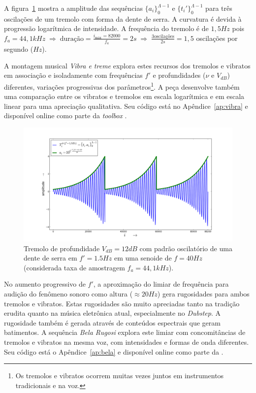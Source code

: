 A figura~\ref{fig:tremolo} mostra a amplitude das sequências $\{a_i\}_0^{\Lambda-1}$ e $\{t_i'\}_0^{\Lambda-1}$
para três oscilações de um tremolo com forma da dente de serra. A curvatura é devida à progressão logarítmica de
intensidade. A frequência do tremolo é de $1,5Hz$ pois $f_a=44,1kHz \; \Rightarrow \; \text{duração} = \frac{i_{\text{máx}}=82000}{f_a}= 2s \; \Rightarrow \; \frac{3\text{oscilações}}{2s}=1,5$ oscilações por segundo ($Hz$). 

A montagem musical \emph{Vibra e treme} explora estes recursos dos tremolos e vibratos em associação e isoladamente
com frequências $f'$
e profundidades ($\nu$ e $V_{dB}$) diferentes, variações progressivas dos parâmetros\footnote{Os tremolos e vibratos ocorrem muitas vezes juntos em instrumentos tradicionais e na voz.}. A peça desenvolve também uma comparação entre os vibratos e tremolos em escala logarítmica e em escala linear para uma apreciação qualitativa. Seu código está no Apêndice~\ref{ap:vibra} e disponível online como parte da \emph{toolbox} \massa.


\begin{figure}[h!]
    \centering
        \includegraphics[width=\textwidth]{figuras/tremolo}
    \caption{Tremolo de profundidade $V_{dB}=12dB$ com padrão oscilatório de uma dente de serra em $f'=1.5Hz$ em uma senoide de $f=40Hz$ (considerada taxa de amostragem $f_a=44,1kHz$).}
        \label{fig:tremolo}
\end{figure}

No aumento progressivo de $f'$,
a aproximação do limiar de frequência
para audição do fenômeno sonoro como
altura ($\approx 20Hz$) gera rugosidades para
ambos tremolos e vibratos. Estas rugosidades são muito apreciadas
tanto na tradição erudita quanto na música eletrônica atual, especialmente no \emph{Dubstep}.
A rugosidade também é gerada através de conteúdos espectrais que geram batimentos.\cite{Porres,porres2009} A sequência \emph{Bela Rugosi}
explora este limiar com concomitâncias de tremolos e vibratos na mesma
voz, com intensidades e formas de onda diferentes. Seu código está o Apêndice~\ref{ap:bela} e disponível online como parte da \massa.

